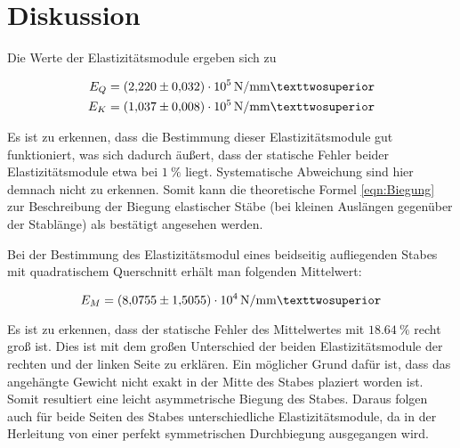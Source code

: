 \section{Diskussion}
\label{sec:Diskussion}

Die Werte der Elastizitätsmodule ergeben sich zu

\begin{align*}
E_Q &= \SI{2.220+-0.032e5}{\newton\per\milli\meter²}\\
E_K &= \SI{1.037+-0.008e5}{\newton\per\milli\meter²}
\end{align*}

Es ist zu erkennen, dass die Bestimmung dieser Elastizitätsmodule gut 
funktioniert, was sich dadurch äußert, dass der statische Fehler
beider Elastizitätsmodule etwa bei $\SI{1}{\percent}$ liegt. 
Systematische Abweichung sind hier demnach nicht zu erkennen. Somit 
kann die theoretische Formel \eqref{eqn:Biegung} zur Beschreibung 
der Biegung elastischer Stäbe (bei kleinen Auslängen gegenüber der
Stablänge) als bestätigt angesehen werden.

Bei der Bestimmung des Elastizitätsmodul eines beidseitig aufliegenden
Stabes mit quadratischem Querschnitt erhält man folgenden Mittelwert: 

\begin{equation*}
E_M = \SI{8.0755+-1.5055e4}{\newton\per\milli\meter²}
\end{equation*}

Es ist zu erkennen, dass der statische Fehler des Mittelwertes mit 
$\SI{18.64}{\percent}$ recht groß ist. Dies ist mit dem großen Unterschied
der beiden Elastizitätsmodule der rechten und der linken Seite zu 
erklären. Ein möglicher Grund dafür ist, dass das angehängte Gewicht
nicht exakt in der Mitte des Stabes plaziert worden ist. Somit resultiert
eine leicht asymmetrische Biegung des Stabes. Daraus folgen auch für beide
Seiten des Stabes unterschiedliche Elastizitätsmodule, da in der Herleitung
von einer perfekt symmetrischen Durchbiegung ausgegangen wird. 

